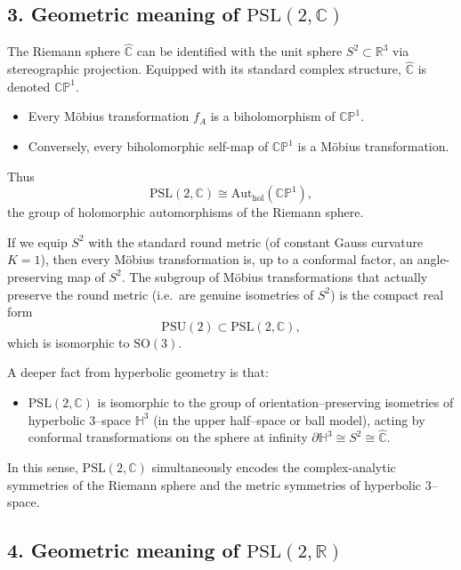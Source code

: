\documentclass[12pt,a4paper]{article}
\theoremstyle{plain}
\theoremstyle{definition}      %
\begin{document}
\subsection*{3. Geometric meaning of $\mathrm{PSL}(2,\mathbb{C})$}

The Riemann sphere $\widehat{\mathbb{C}}$ can be identified with the unit
sphere $S^{2}\subset\mathbb{R}^{3}$ via stereographic projection.  Equipped
with its standard complex structure, $\widehat{\mathbb{C}}$ is denoted
$\mathbb{CP}^{1}$.

\begin{itemize}
	\item Every Möbius transformation $f_A$ is a biholomorphism of
	$\mathbb{CP}^{1}$.
	\item Conversely, every biholomorphic self-map of $\mathbb{CP}^{1}$ is a
	Möbius transformation.
\end{itemize}

Thus
\[
\mathrm{PSL}(2,\mathbb{C})
\cong \mathrm{Aut}_{\mathrm{hol}}(\mathbb{CP}^{1}),
\]
the group of holomorphic automorphisms of the Riemann sphere.

If we equip $S^{2}$ with the standard round metric (of constant Gauss
curvature $K=1$), then every Möbius transformation is, up to a conformal
factor, an angle-preserving map of $S^{2}$.  The subgroup of Möbius
transformations that actually preserve the round metric (i.e.\ are genuine
isometries of $S^{2}$) is the compact real form
\[
\mathrm{PSU}(2) \subset \mathrm{PSL}(2,\mathbb{C}),
\]
which is isomorphic to $\mathrm{SO}(3)$.

A deeper fact from hyperbolic geometry is that:

\begin{itemize}
	\item $\mathrm{PSL}(2,\mathbb{C})$ is isomorphic to the group of
	orientation–preserving isometries of hyperbolic $3$–space
	$\mathbb{H}^{3}$ (in the upper half--space or ball model), acting
	by conformal transformations on the sphere at infinity
	$\partial\mathbb{H}^{3} \cong S^{2} \cong \widehat{\mathbb{C}}$.
\end{itemize}

In this sense, $\mathrm{PSL}(2,\mathbb{C})$ simultaneously encodes the
complex-analytic symmetries of the Riemann sphere and the metric symmetries
of hyperbolic $3$--space.

\subsection*{4. Geometric meaning of $\mathrm{PSL}(2,\mathbb{R})$}
\end{document}
